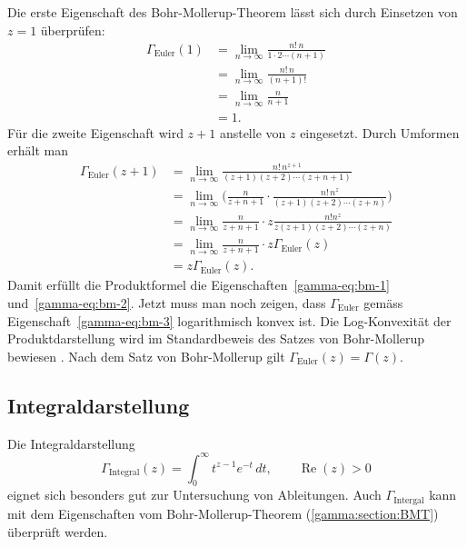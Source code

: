 Die erste Eigenschaft des Bohr-Mollerup-Theorem lässt sich durch Einsetzen von $z=1$ überprüfen:
\begin{equation}
\label{gamma-eq:euler-first-property}
    \begin{split}
    \Gamma_{\text{Euler}}(1)
        &= \lim_{n \to \infty} \frac{n!\,n}{1 \cdot 2 \cdots (n+1)} \\
        &= \lim_{n \to \infty} \frac{n!\,n}{(n+1)!} \\
        &= \lim_{n \to \infty} \frac{n}{n+1} \\
        &= 1.
    \end{split}
\end{equation}
Für die zweite Eigenschaft wird $z+1$ anstelle von $z$ eingesetzt. Durch Umformen erhält man
\begin{equation}
\label{gamma-eq:euler-recursive-property}
    \begin{split}
    \Gamma_{\text{Euler}}(z+1)
        &= \lim_{n \to \infty}
            \frac{n!\,n^{z+1}}{(z+1)(z+2)\cdots(z+n+1)} \\
        &= \lim_{n \to \infty}
            \biggl(
            \frac{n}{z+n+1}
            \cdot
            \frac{n!\,n^z}{(z+1)(z+2)\cdots(z+n)}
            \biggr) \\
        &= \lim_{n \to \infty}
            \frac{n}{z+n+1}
            \cdot z
            \frac{n!n^{z}}{z(z+1)(z+2)\cdots(z+n)} \\
        &= \lim_{n \to \infty} \frac{n}{z+n+1}
            \cdot z\Gamma_{\text{Euler}}(z) \\
        &= z\Gamma_{\text{Euler}}(z).
    \end{split}
\end{equation}
Damit erfüllt die Produktformel die Eigenschaften~\ref{gamma-eq:bm-1} und~\ref{gamma-eq:bm-2}.
Jetzt muss man noch zeigen, dass $\Gamma_{\text{Euler}}$ gemäss Eigenschaft~\ref{gamma-eq:bm-3} logarithmisch konvex ist.
Die Log-Konvexität der Produktdarstellung wird im Standardbeweis des Satzes von Bohr-Mollerup bewiesen \cite[Abschnitt 4.1.4]{buch:MatSeSspezielleFunktionen}.
Nach dem Satz von Bohr-Mollerup gilt $\Gamma_{\text{Euler}}(z) = \Gamma(z)$.

\subsection{Integraldarstellung}

Die Integraldarstellung
%
%
\begin{equation}
\label{gamma-eq:integral}
    \Gamma_{\text{Integral}}(z) = \int_0^\infty t^{z-1} e^{-t}\,dt,
    \qquad \operatorname{Re}(z)>0
\end{equation}
eignet sich besonders gut zur Untersuchung von Ableitungen. 
Auch $\Gamma_{\text{Intergal}}$ kann mit dem Eigenschaften vom Bohr-Mollerup-Theorem (\ref{gamma:section:BMT}) überprüft werden. 

